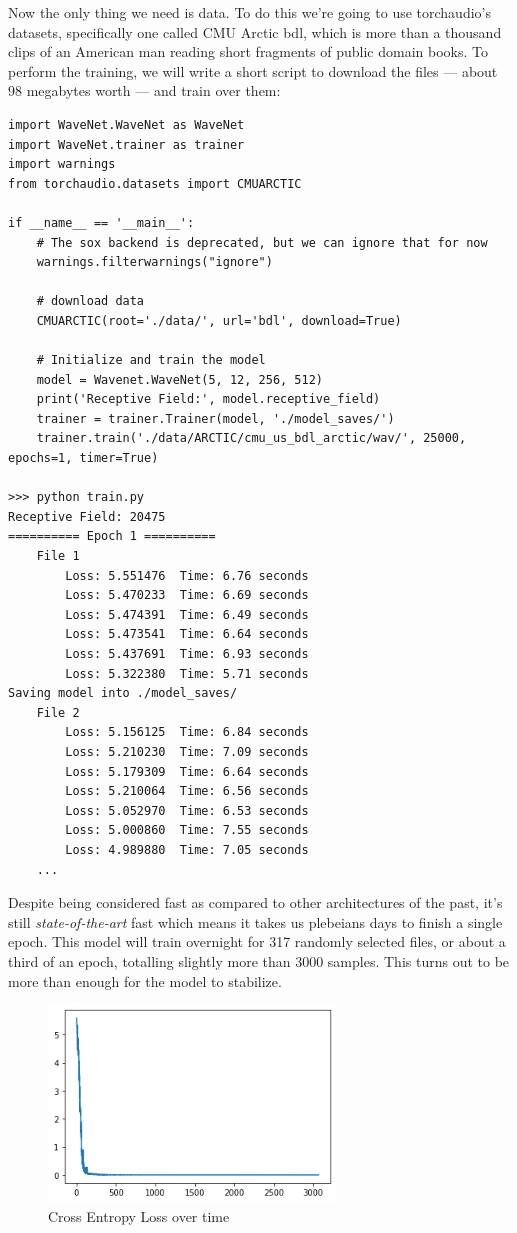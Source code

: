 Now the only thing we need is data. To do this we're going to use torchaudio's datasets, specifically one called CMU Arctic bdl, which is more than a thousand clips of an American man reading short fragments of public domain books. To perform the training, we will write a short script to download the files --- about 98 megabytes worth --- and train over them:

\newpage
\begin{verbatim}
import WaveNet.WaveNet as WaveNet
import WaveNet.trainer as trainer
import warnings
from torchaudio.datasets import CMUARCTIC

if __name__ == '__main__':
    # The sox backend is deprecated, but we can ignore that for now
    warnings.filterwarnings("ignore")

    # download data
    CMUARCTIC(root='./data/', url='bdl', download=True)

    # Initialize and train the model
    model = Wavenet.WaveNet(5, 12, 256, 512)
    print('Receptive Field:', model.receptive_field)
    trainer = trainer.Trainer(model, './model_saves/')
    trainer.train('./data/ARCTIC/cmu_us_bdl_arctic/wav/', 25000, epochs=1, timer=True)
    
>>> python train.py
Receptive Field: 20475
========== Epoch 1 ==========
	File 1
		Loss: 5.551476	Time: 6.76 seconds
		Loss: 5.470233	Time: 6.69 seconds
		Loss: 5.474391	Time: 6.49 seconds
		Loss: 5.473541	Time: 6.64 seconds
		Loss: 5.437691	Time: 6.93 seconds
		Loss: 5.322380	Time: 5.71 seconds
Saving model into ./model_saves/
	File 2
		Loss: 5.156125	Time: 6.84 seconds
		Loss: 5.210230	Time: 7.09 seconds
		Loss: 5.179309	Time: 6.64 seconds
		Loss: 5.210064	Time: 6.56 seconds
		Loss: 5.052970	Time: 6.53 seconds
		Loss: 5.000860	Time: 7.55 seconds
		Loss: 4.989880	Time: 7.05 seconds
    ...
\end{verbatim}



Despite being considered fast as compared to other architectures of the past, it's still \textit{state-of-the-art} fast which means it takes us plebeians days to finish a single epoch. This model will train overnight for 317 randomly selected files, or about a third of an epoch, totalling slightly more than 3000 samples. This turns out to be more than enough for the model to stabilize.

\begin{figure}[h]
    \centering
    \includegraphics[width=3in]{images/loss.png}
    \caption{Cross Entropy Loss over time}
    \label{fig:loss}
\end{figure}

